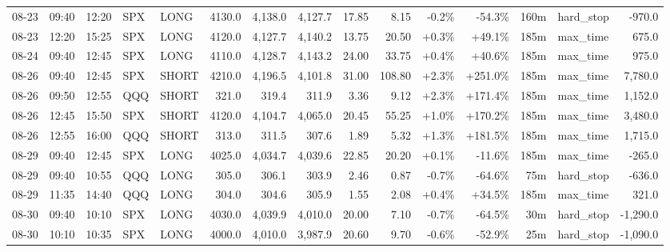 \documentclass[11pt,a4paper,twoside]{article}
\begin{document}
\begin{landscape}
\begin{center}
\begin{longtable}{>{\color{txtmain}}l l l l l r r r r r r r r >{\color{txtmain}}l r}
08-23 & 09:40 & 12:20 & SPX & LONG & 4130.0 & 4,138.0 & 4,127.7 & 17.85 & 8.15 & \textcolor{lossred}{-0.2\%} & \textcolor{lossred}{-54.3\%} & 160m & hard\_stop & \textcolor{lossred}{-970.0} \\
08-23 & 12:20 & 15:25 & SPX & LONG & 4120.0 & 4,127.7 & 4,140.2 & 13.75 & 20.50 & \textcolor{wingreen}{+0.3\%} & \textcolor{wingreen}{+49.1\%} & 185m & max\_time & \textcolor{wingreen}{675.0} \\
08-24 & 09:40 & 12:45 & SPX & LONG & 4110.0 & 4,128.7 & 4,143.2 & 24.00 & 33.75 & \textcolor{wingreen}{+0.4\%} & \textcolor{wingreen}{+40.6\%} & 185m & max\_time & \textcolor{wingreen}{975.0} \\
08-26 & 09:40 & 12:45 & SPX & SHORT & 4210.0 & 4,196.5 & 4,101.8 & 31.00 & 108.80 & \textcolor{wingreen}{+2.3\%} & \textcolor{wingreen}{+251.0\%} & 185m & max\_time & \textcolor{wingreen}{7,780.0} \\
08-26 & 09:50 & 12:55 & QQQ & SHORT & 321.0 & 319.4 & 311.9 & 3.36 & 9.12 & \textcolor{wingreen}{+2.3\%} & \textcolor{wingreen}{+171.4\%} & 185m & max\_time & \textcolor{wingreen}{1,152.0} \\
08-26 & 12:45 & 15:50 & SPX & SHORT & 4120.0 & 4,104.7 & 4,065.0 & 20.45 & 55.25 & \textcolor{wingreen}{+1.0\%} & \textcolor{wingreen}{+170.2\%} & 185m & max\_time & \textcolor{wingreen}{3,480.0} \\
08-26 & 12:55 & 16:00 & QQQ & SHORT & 313.0 & 311.5 & 307.6 & 1.89 & 5.32 & \textcolor{wingreen}{+1.3\%} & \textcolor{wingreen}{+181.5\%} & 185m & max\_time & \textcolor{wingreen}{1,715.0} \\
08-29 & 09:40 & 12:45 & SPX & LONG & 4025.0 & 4,034.7 & 4,039.6 & 22.85 & 20.20 & \textcolor{wingreen}{+0.1\%} & \textcolor{lossred}{-11.6\%} & 185m & max\_time & \textcolor{lossred}{-265.0} \\
08-29 & 09:40 & 10:55 & QQQ & LONG & 305.0 & 306.1 & 303.9 & 2.46 & 0.87 & \textcolor{lossred}{-0.7\%} & \textcolor{lossred}{-64.6\%} & 75m & hard\_stop & \textcolor{lossred}{-636.0} \\
08-29 & 11:35 & 14:40 & QQQ & LONG & 304.0 & 304.6 & 305.9 & 1.55 & 2.08 & \textcolor{wingreen}{+0.4\%} & \textcolor{wingreen}{+34.5\%} & 185m & max\_time & \textcolor{wingreen}{321.0} \\
08-30 & 09:40 & 10:10 & SPX & LONG & 4030.0 & 4,039.9 & 4,010.0 & 20.00 & 7.10 & \textcolor{lossred}{-0.7\%} & \textcolor{lossred}{-64.5\%} & 30m & hard\_stop & \textcolor{lossred}{-1,290.0} \\
08-30 & 10:10 & 10:35 & SPX & LONG & 4000.0 & 4,010.0 & 3,987.9 & 20.60 & 9.70 & \textcolor{lossred}{-0.6\%} & \textcolor{lossred}{-52.9\%} & 25m & hard\_stop & \textcolor{lossred}{-1,090.0} \\

\end{longtable}
\end{center}
\end{landscape}
\end{document}
